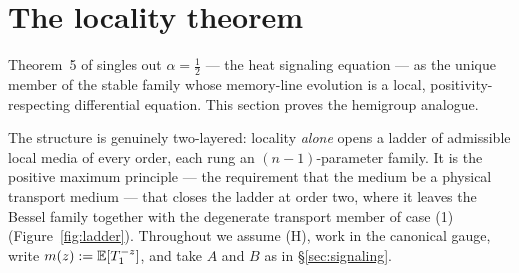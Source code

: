 %

\section{The locality theorem}\label{sec:locality}

Theorem~5 of  singles out $\alpha = \tfrac12$ --- the heat
signaling equation --- as the unique member of the stable family whose memory-line evolution is
a local, positivity-respecting differential equation. This section proves the hemigroup
analogue.

The structure is genuinely two-layered: locality \emph{alone} opens a ladder of admissible
local media of every order, each rung an $(n-1)$-parameter family. It is the positive
maximum principle --- the requirement that the medium be a physical transport medium --- that
closes the ladder at order two, where it leaves the Bessel family together with the degenerate
transport member of case (1) (Figure~\ref{fig:ladder}). Throughout we assume (H), work in the
canonical gauge, write $m(z) := \mathbb{E}[T_1^{-z}]$, and take $A$ and $B$ as in
\S\ref{sec:signaling}.



